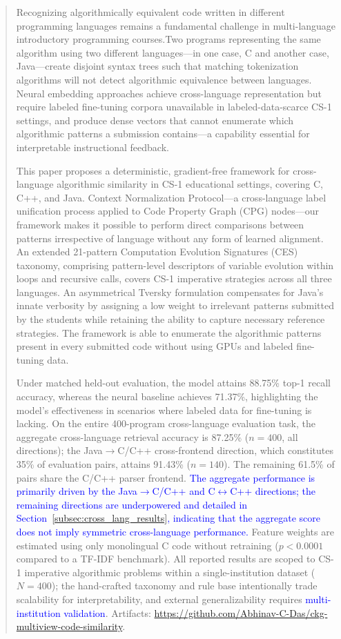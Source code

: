 \documentclass{ieeeaccess}
\begin{document}
\begin{abstract}
Recognizing algorithmically equivalent code written in different programming languages remains a fundamental challenge in multi-language introductory programming courses.Two programs representing the same algorithm using two different languages---in one case, C and another case, Java---create disjoint syntax trees such that matching tokenization algorithms will not detect algorithmic equivalence between languages. Neural embedding approaches achieve cross-language representation but require labeled fine-tuning corpora unavailable in labeled-data-scarce CS-1 settings, and produce dense vectors that cannot enumerate which algorithmic patterns a submission contains---a capability essential for interpretable instructional feedback.

This paper proposes a deterministic, gradient-free framework for cross-language algorithmic similarity in CS-1 educational settings, covering C, C++, and Java. Context Normalization Protocol---a cross-language label unification process applied to Code Property Graph (CPG) nodes—our framework makes it possible to perform direct comparisons between patterns irrespective of language without any form of learned alignment. An extended 21-pattern Computation Evolution Signatures (CES) taxonomy, comprising pattern-level descriptors of variable evolution within loops and recursive calls, covers CS-1 imperative strategies across all three languages.  An asymmetrical Tversky formulation compensates for Java’s innate verbosity by assigning a low weight to irrelevant patterns submitted by the students while retaining the ability to capture necessary reference strategies. The framework is able to enumerate the algorithmic patterns present in every submitted code without using GPUs and labeled fine-tuning data.

Under matched held-out evaluation, the model attains 88.75\% top-1 recall accuracy, whereas the neural baseline achieves 71.37\%, highlighting the model’s effectiveness in scenarios where labeled data for fine-tuning is lacking. On the entire 400-program cross-language evaluation task, the aggregate cross-language retrieval accuracy is 87.25\% ($n=400$, all directions); the Java$\rightarrow$C/C++ cross-frontend direction, which constitutes 35\% of evaluation pairs, attains 91.43\% ($n=140$). The remaining 61.5\% of pairs share the C/C++ parser frontend. \textcolor{blue}{The aggregate performance is primarily driven by the Java$\rightarrow$C/C++ and C$\leftrightarrow$C++ directions; the remaining directions are underpowered and detailed in Section~\ref{subsec:cross_lang_results}, indicating that the aggregate score does not imply symmetric cross-language performance.} Feature weights are estimated using only monolingual C code without retraining ($p{<}0.0001$ compared to a TF-IDF benchmark). All reported results are scoped to CS-1 imperative algorithmic problems within a single-institution dataset ($N{=}400$); the hand-crafted taxonomy and rule base intentionally trade scalability for interpretability, and external generalizability requires \textcolor{blue}{multi-institution validation}. Artifacts: \url{https://github.com/Abhinav-C-Das/ckg-multiview-code-similarity}.
\end{abstract}
\end{document}
